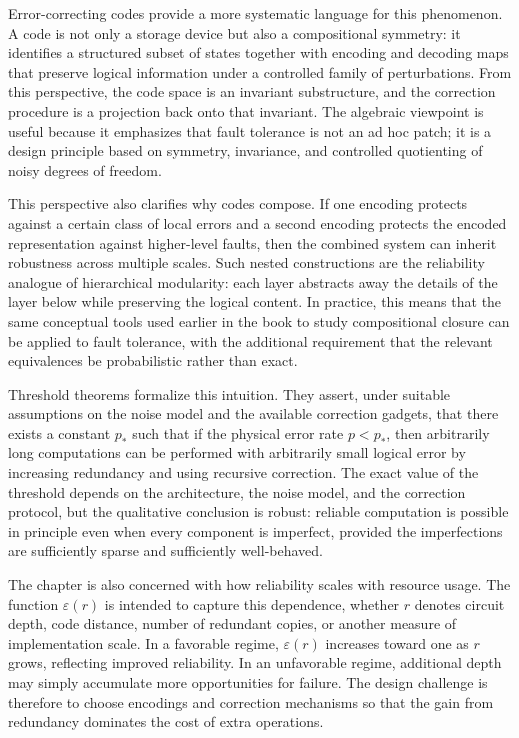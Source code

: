 \documentclass[11pt]{article}
\begin{document}
Error-correcting codes provide a more systematic language for this phenomenon. A code is not only a storage device but also a compositional symmetry: it identifies a structured subset of states together with encoding and decoding maps that preserve logical information under a controlled family of perturbations. From this perspective, the code space is an invariant substructure, and the correction procedure is a projection back onto that invariant. The algebraic viewpoint is useful because it emphasizes that fault tolerance is not an ad hoc patch; it is a design principle based on symmetry, invariance, and controlled quotienting of noisy degrees of freedom.

This perspective also clarifies why codes compose. If one encoding protects against a certain class of local errors and a second encoding protects the encoded representation against higher-level faults, then the combined system can inherit robustness across multiple scales. Such nested constructions are the reliability analogue of hierarchical modularity: each layer abstracts away the details of the layer below while preserving the logical content. In practice, this means that the same conceptual tools used earlier in the book to study compositional closure can be applied to fault tolerance, with the additional requirement that the relevant equivalences be probabilistic rather than exact.

Threshold theorems formalize this intuition. They assert, under suitable assumptions on the noise model and the available correction gadgets, that there exists a constant \(p_{\ast}\) such that if the physical error rate \(p < p_{\ast}\), then arbitrarily long computations can be performed with arbitrarily small logical error by increasing redundancy and using recursive correction. The exact value of the threshold depends on the architecture, the noise model, and the correction protocol, but the qualitative conclusion is robust: reliable computation is possible in principle even when every component is imperfect, provided the imperfections are sufficiently sparse and sufficiently well-behaved.

The chapter is also concerned with how reliability scales with resource usage. The function \(\varepsilon(r)\) is intended to capture this dependence, whether \(r\) denotes circuit depth, code distance, number of redundant copies, or another measure of implementation scale. In a favorable regime, \(\varepsilon(r)\) increases toward one as \(r\) grows, reflecting improved reliability. In an unfavorable regime, additional depth may simply accumulate more opportunities for failure. The design challenge is therefore to choose encodings and correction mechanisms so that the gain from redundancy dominates the cost of extra operations.
\end{document}
